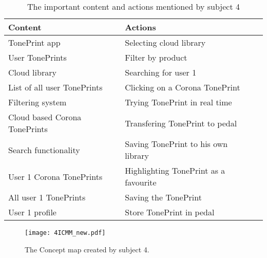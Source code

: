 \begin{table}[H]
\begin{minipage}[b]{\linewidth}\centering
	\begin{tabular} {|l|l|l|} \hline
		\rowcolor{xGray25} \textbf{Content} & \textbf{Actions} \\  \hline
		TonePrint app & Selecting cloud library \\
		User TonePrints & Filter by product \\
		Cloud library & Searching for user 1 \\
		List of all user TonePrints & Clicking on a Corona TonePrint \\
		Filtering system & Trying TonePrint in real time \\
		Cloud based Corona TonePrints & Transfering TonePrint to pedal \\
		Search functionality & Saving TonePrint to his own library \\
		User 1 Corona TonePrints & Highlighting TonePrint as a favourite \\
		All user 1 TonePrints & Saving the TonePrint \\
		User 1 profile & Store TonePrint in pedal \\ \hline
	\end{tabular}
	\caption{The important content and actions mentioned by subject 4}
	\label{tab:Subject4ContentActions}
\end{minipage}
\end{table}
%
\begin{figure}[H]
	\centering
	\texttt{[image: 4ICMM\_new.pdf]}
	\caption{The Concept map created by subject 4.}
	\label{fig:ICMM4}
\end{figure}


